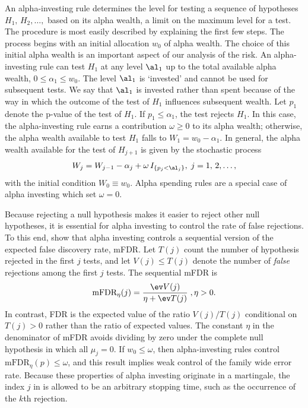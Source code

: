 \documentclass[12pt]{article}
\begin{document}
 An alpha-investing rule \citep{fosterstine08} determines the level for testing
 a sequence of hypotheses $H_1, \,H_2, \dots,$ based on its alpha wealth, a
 limit on the maximum level for a test.  The procedure is most easily described
 by explaining the first few steps.  The process begins with an initial
 allocation $w_0$ of alpha wealth.  The choice of this initial alpha wealth is
 an important aspect of our analysis of the risk.  An alpha-investing rule can
 test $H_1$ at any level $\al_1$ up to the total available alpha wealth, $0 \le
 \alpha_1 \le w_0$.  The level $\al_1$ is `invested' and cannot be used for
 subsequent tests.  We say that $\al_1$ is invested rather than spent because of
 the way in which the outcome of the test of $H_1$ influences subsequent wealth.
  Let $p_1$ denote the p-value of the test of $H_1$.  If $p_1 \le \alpha_1$, the
 test rejects $H_1$.  In this case, the alpha-investing rule earns a
 contribution $\omega \ge 0$ to its alpha wealth; otherwise, the alpha wealth
 available to test $H_1$ falls to $W_1 = w_0 - \alpha_1$.   In general, the
 alpha wealth available for the test of $H_{j+1}$ is given by the stochastic
 process
 \begin{equation}
    W_j = W_{j-1} - \alpha_j + \omega \, I_{\{p_j < \al_j\}}, \; j = 1,\,2,\ldots,
 \label{eq:Wj}
 \end{equation}
 with the initial condition $W_0 \equiv w_0$.  Alpha spending rules are a
 special case of alpha investing which set $\omega = 0$.  


 Because rejecting a null hypothesis makes it easier to reject other null
 hypotheses, it is essential for alpha investing to control the rate of false
 rejections.  To this end, \citet{fosterstine08} show that alpha investing
 controls a sequential version of the expected false discovery rate, mFDR.  Let
 $T(j)$ count the number of hypothesis rejected in the first $j$ tests, and let
 $V(j) \le T(j)$ denote the number of {\em false} rejections among the first $j$
 tests.  The sequential mFDR is
 \begin{equation}
    \mbox{mFDR}_\eta(j) = \frac{\ev V(j)}{\eta + \ev T(j)} \;, \eta > 0.
 \label{eq:mFDR}
 \end{equation}
 In contrast, FDR is the expected value of the ratio $V(j)/T(j)$ conditional on
 $T(j)>0$ rather than the ratio of expected values.  The constant $\eta$ in the
 denominator of mFDR avoids dividing by zero under the complete null hypothesis
 in which all $\mu_j = 0$.  If $w_0 \le \omega$, then alpha-investing rules
 control $\mbox{mFDR}_\eta(p) \le \omega$, and this result implies weak control
 of the family wide error rate.  Because these properties of alpha investing
 originate in a martingale, the index $j$ in  is allowed to be an
 arbitrary stopping time, such as the occurrence of the $k$th rejection.
\end{document}
